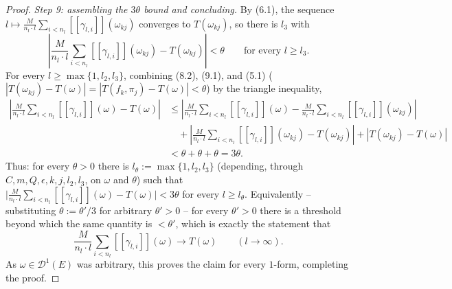 \begin{proof}
  \emph{Step 9: assembling the $3\theta$ bound and concluding.} By (6.1), the sequence
  $l\mapsto \frac{M}{n_l\cdot l}\sum_{i<n_l}[[\gamma_{l,i}]](\omega_{kj})$ converges to
  $T(\omega_{kj})$, so there is $l_3$ with
  \[
    \left|\frac{M}{n_l\cdot l}\sum_{i<n_l}[[\gamma_{l,i}]](\omega_{kj}) - T(\omega_{kj})\right|
    < \theta
    \qquad \text{for every } l\ge l_3
    . \tag{9.1}
  \]
  For every $l\ge\max\{1,l_2,l_3\}$, combining (8.2), (9.1), and (5.1) ($|T(\omega_{kj}) -
  T(\omega)| = |T(f_k,\pi_j)-T(\omega)| < \theta$) by the triangle inequality,
  \begin{align*}
    \left|\frac{M}{n_l\cdot l}\sum_{i<n_l}[[\gamma_{l,i}]](\omega) - T(\omega)\right|
    &\le \left|\frac{M}{n_l\cdot l}\sum_{i<n_l}[[\gamma_{l,i}]](\omega)
          - \frac{M}{n_l\cdot l}\sum_{i<n_l}[[\gamma_{l,i}]](\omega_{kj})\right|
    \\&\quad
      + \left|\frac{M}{n_l\cdot l}\sum_{i<n_l}[[\gamma_{l,i}]](\omega_{kj}) - T(\omega_{kj})\right|
      + |T(\omega_{kj}) - T(\omega)|
    \\
    &< \theta+\theta+\theta = 3\theta
    .
  \end{align*}
  Thus: for every $\theta>0$ there is $l_\theta:=\max\{1,l_2,l_3\}$ (depending, through $C,m,Q,
  \epsilon,k,j,l_2,l_3$, on $\omega$ and $\theta$) such that
  $\bigl|\frac{M}{n_l\cdot l}\sum_{i<n_l}[[\gamma_{l,i}]](\omega) - T(\omega)\bigr| < 3\theta$ for
  every $l\ge l_\theta$. Equivalently -- substituting $\theta:=\theta'/3$ for arbitrary $\theta'>0$
  -- for every $\theta'>0$ there is a threshold beyond which the same quantity is $<\theta'$, which
  is exactly the statement that
  \[
    \frac{M}{n_l\cdot l}\sum_{i<n_l}[[\gamma_{l,i}]](\omega) \longrightarrow T(\omega)
    \qquad (l\to\infty)
    .
  \]
  As $\omega\in\mathcal{D}^1(E)$ was arbitrary, this proves the claim for every $1$-form, completing
  the proof.
\end{proof}
